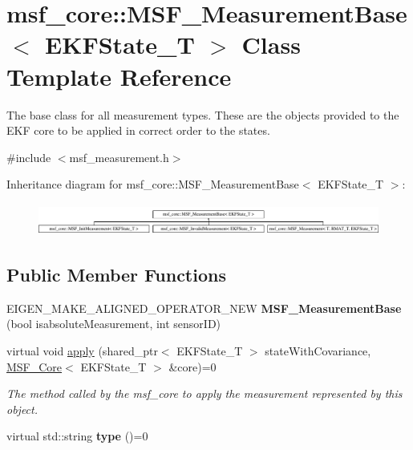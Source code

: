\hypertarget{classmsf__core_1_1MSF__MeasurementBase}{\section{msf\-\_\-core\-:\-:M\-S\-F\-\_\-\-Measurement\-Base$<$ E\-K\-F\-State\-\_\-\-T $>$ Class Template Reference}
\label{classmsf__core_1_1MSF__MeasurementBase}
}


The base class for all measurement types. These are the objects provided to the E\-K\-F core to be applied in correct order to the states.  




{\ttfamily \#include $<$msf\-\_\-measurement.\-h$>$}

Inheritance diagram for msf\-\_\-core\-:\-:M\-S\-F\-\_\-\-Measurement\-Base$<$ E\-K\-F\-State\-\_\-\-T $>$\-:\begin{figure}[H]
\begin{center}
\leavevmode
\includegraphics[height=1.060606cm]{classmsf__core_1_1MSF__MeasurementBase}
\end{center}
\end{figure}
\subsection*{Public Member Functions}
\begin{DoxyCompactItemize}
\item 
\hypertarget{classmsf__core_1_1MSF__MeasurementBase_a415d8c321cebf22510cce29f69a3b22f}{E\-I\-G\-E\-N\-\_\-\-M\-A\-K\-E\-\_\-\-A\-L\-I\-G\-N\-E\-D\-\_\-\-O\-P\-E\-R\-A\-T\-O\-R\-\_\-\-N\-E\-W {\bfseries M\-S\-F\-\_\-\-Measurement\-Base} (bool isabsolute\-Measurement, int sensor\-I\-D)}\label{classmsf__core_1_1MSF__MeasurementBase_a415d8c321cebf22510cce29f69a3b22f}

\item 
\hypertarget{classmsf__core_1_1MSF__MeasurementBase_ac1c4001e0c61b7cd2b551c0adeae7109}{virtual void \hyperlink{classmsf__core_1_1MSF__MeasurementBase_ac1c4001e0c61b7cd2b551c0adeae7109}{apply} (shared\-\_\-ptr$<$ E\-K\-F\-State\-\_\-\-T $>$ state\-With\-Covariance, \hyperlink{classmsf__core_1_1MSF__Core}{M\-S\-F\-\_\-\-Core}$<$ E\-K\-F\-State\-\_\-\-T $>$ \&core)=0}\label{classmsf__core_1_1MSF__MeasurementBase_ac1c4001e0c61b7cd2b551c0adeae7109}

\begin{DoxyCompactList}\small\item\em The method called by the msf\-\_\-core to apply the measurement represented by this object. \end{DoxyCompactList}\item 
\hypertarget{classmsf__core_1_1MSF__MeasurementBase_a6a711d7ed976c0aed497efc1b8fbe3e7}{virtual std\-::string {\bfseries type} ()=0}\label{classmsf__core_1_1MSF__MeasurementBase_a6a711d7ed976c0aed497efc1b8fbe3e7}

\end{DoxyCompactItemize}
